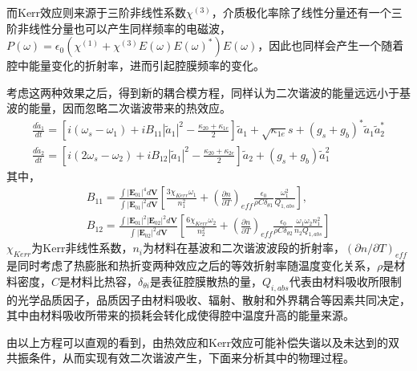 \documentclass[UTF8,a4paper,cs4size,hyperref]{ctexart}
\begin{document}
而Kerr效应则来源于三阶非线性系数$\chi^{(3)}$，介质极化率除了线性分量还有一个三阶非线性分量也可以产生同样频率的电磁波，$P(\omega) = \epsilon_0(\chi^{(1)}+\chi^{(3)}E(\omega)E(\omega)^*)E(\omega)$，因此也同样会产生一个随着腔中能量变化的折射率，进而引起腔膜频率的变化。

考虑这两种效果之后，得到新的耦合模方程，同样认为二次谐波的能量远远小于基波的能量，因而忽略二次谐波带来的热效应。
\begin{gather}
\label{eq:cpmodec}
\frac{d\tilde{a}_1}{dt} = [i(\omega_s-\omega_1)+iB_{11}|\tilde{a}_1|^2-\frac{\kappa_{20}+\kappa_{1e}}{2}]\tilde{a}_1+\sqrt{\kappa_{1e}}s+(g_s+g_b)^*\tilde{a}_1\tilde{a}_2^* \\
\frac{d\tilde{a}_2}{dt} = [i(2\omega_s-\omega_2)+iB_{12}|\tilde{a}_1|^2-\frac{\kappa_{20}+\kappa_{2e}}{2}]\tilde{a}_2+(g_s+g_b)\tilde{a}_1^2
\label{eq:cpmodec2}
\end{gather}
其中，
\begin{gather}
B_{11} = \frac{\int|\mathbf{E}_{01}|^4d\mathbf{V}}{\int|\mathbf{E}_{01}|^2d\mathbf{V}}[\frac{3\chi_{Kerr}\omega_1}{n_1^2}+(\frac{\partial n}{\partial T})_{eff}\frac{\epsilon_0}{\rho C \delta_{\theta 1}}\frac{\omega_1^2}{Q_{1,abs}}], \\
B_{12} = \frac{\int|\mathbf{E}_{01}|^2|\mathbf{E}_{02}|^2d\mathbf{V}}{\int|\mathbf{E}_{02}|^2d\mathbf{V}}[\frac{6\chi_{Kerr}\omega_2}{n_2^2}+(\frac{\partial n}{\partial T})_{eff}\frac{\epsilon_0}{\rho C \delta_{\theta 2}}\frac{\omega_1\omega_2n_1^2}{n_2Q_{1,abs}}]
\end{gather}
$\chi_{Kerr}$为Kerr非线性系数，$n_i$为材料在基波和二次谐波波段的折射率，$(\partial n/\partial T)_{eff}$是同时考虑了热膨胀和热折变两种效应之后的等效折射率随温度变化关系，$\rho$是材料密度，$C$是材料比热容，$\delta_{\theta i}$是表征腔膜散热的量\cite{fomin2005nonstationary}，$Q_{i,abs}$代表由材料吸收所限制的光学品质因子\cite{rokhsari2004loss}，品质因子由材料吸收、辐射、散射和外界耦合等因素共同决定，其中由材料吸收所带来的损耗会转化成使得腔中温度升高的能量来源。

由以上方程可以直观的看到，由热效应和Kerr效应可能补偿失谐以及未达到的双共振条件，从而实现有效二次谐波产生，下面来分析其中的物理过程。
\end{document}
